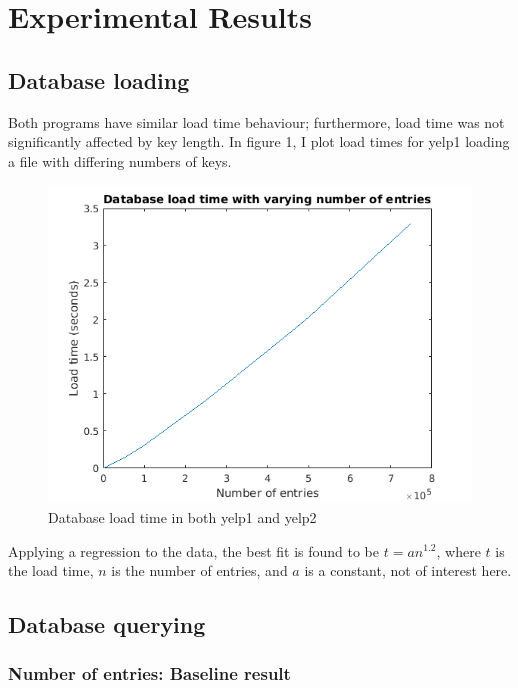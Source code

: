 \documentclass[australian,english]{article}
\begin{document}
\section*{Experimental Results}

\subsection*{Database loading}

Both programs have similar load time behaviour; furthermore, load
time was not significantly affected by key length. In figure 1, I
plot load times for yelp1 loading a file with differing numbers of
keys.

\begin{figure}
\includegraphics[scale=0.8]{figs/loadtime}

\caption{Database load time in both yelp1 and yelp2}
\end{figure}

Applying a regression to the data, the best fit is found to be $t=an^{1.2}$,
where $t$ is the load time, $n$ is the number of entries, and $a$
is a constant, not of interest here.

\subsection*{Database querying}

\subsubsection*{Number of entries: Baseline result}
\end{document}
